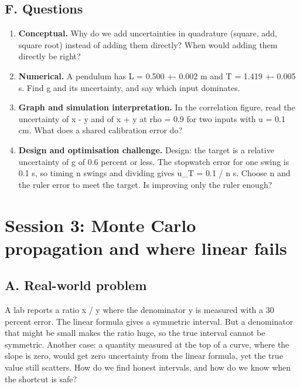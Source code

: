 \documentclass[11pt,a4paper]{article}
\begin{document}
\subsection*{F. Questions}
\begin{enumerate}[nosep]
\item \textbf{Conceptual.} Why do we add uncertainties in quadrature (square, add, square root) instead of adding them directly? When would adding them directly be right?
\item \textbf{Numerical.} A pendulum has L = 0.500 +- 0.002 m and T = 1.419 +- 0.005 s. Find g and its uncertainty, and say which input dominates.
\item \textbf{Graph and simulation interpretation.} In the correlation figure, read the uncertainty of x - y and of x + y at rho = 0.9 for two inputs with u = 0.1 cm. What does a shared calibration error do?
\item \textbf{Design and optimisation challenge.} Design: the target is a relative uncertainty of g of 0.6 percent or less. The stopwatch error for one swing is 0.1 s, so timing n swings and dividing gives u\_T = 0.1 / n s. Choose n and the ruler error to meet the target. Is improving only the ruler enough?
\end{enumerate}

\section{Session 3: Monte Carlo propagation and where linear fails}

\subsection*{A. Real-world problem}
A lab reports a ratio x / y where the denominator y is measured with a 30 percent error. The linear formula gives a symmetric interval. But a denominator that might be small makes the ratio huge, so the true interval cannot be symmetric. Another case: a quantity measured at the top of a curve, where the slope is zero, would get zero uncertainty from the linear formula, yet the true value still scatters. How do we find honest intervals, and how do we know when the shortcut is safe?
\end{document}
